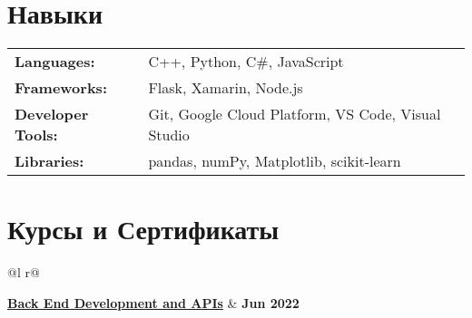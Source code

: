 \documentclass[a4paper,11pt]{article}
\begin{document}

\section{Навыки}
\begin{tabularx}{\linewidth}{@{}l X@{}}
\textbf{Languages:} & \normalsize{C++, Python, C\#, JavaScript} \\
\textbf{Frameworks:} &  \normalsize{Flask, Xamarin, Node.js}\\
\textbf{Developer Tools:}  &  \normalsize{Git, Google Cloud Platform, VS Code, Visual Studio}\\  
\textbf{Libraries:}  &  \normalsize{pandas, numPy, Matplotlib, scikit-learn}\\  
\end{tabularx}

\section{Курсы и Сертификаты}


\begin{tabularx}{\linewidth}{ @{}l r@{} }

\href{https://www.freecodecamp.org/certification/dekrylov/back-end-development-and-apis}{\textbf{Back End Development and APIs}} & \hfill \textbf{Jun 2022} \\[3.75pt]
  \\
\end{tabularx}


\vfill
{}
\end{document}
